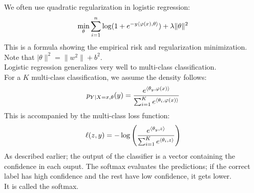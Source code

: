 \documentclass[12pt]{article}
\begin{document}
We often use quadratic regularization in logistic
regression:
\[ \min_\theta \sum_{i=1}^n 
\log(1 + e^{-y\left\langle \varphi(x), \theta \right\rangle}) 
+ \lambda \|\theta\|^2 \]
This is a formula showing the empirical risk
and regularization minimization. \\
Note that $|\theta\|^2 = \|w^2\| + b^2$. \\

Logistic regression generalizes very well
to multi-class classification. \\
For a $K$ multi-class classification, we assume the density
follows:
\[ p_{Y \mid X = x, \theta}(y)
= \dfrac{e^{\left\langle \theta_y, \varphi(x) \right\rangle}}
{\sum_{i = 1}^K e^{\left\langle \theta_i, \varphi(x) \right\rangle}} \]
This is accompanied by the multi-class loss function:
\[ \ell(z, y) = -\log\left( \dfrac{e^{\left\langle \theta_y, z \right\rangle}}
{\sum_{i = 1}^K e^{\left\langle \theta_i, z \right\rangle}} \right) \]
As described earlier; the output of the classifier
is a vector containing the confidence in each ouput.
The softmax evaluates the predictions; if the
correct label has high confidence and the rest have low
confidence, it gets lower. \\
It is called the softmax. \\

\newpage
\end{document}

